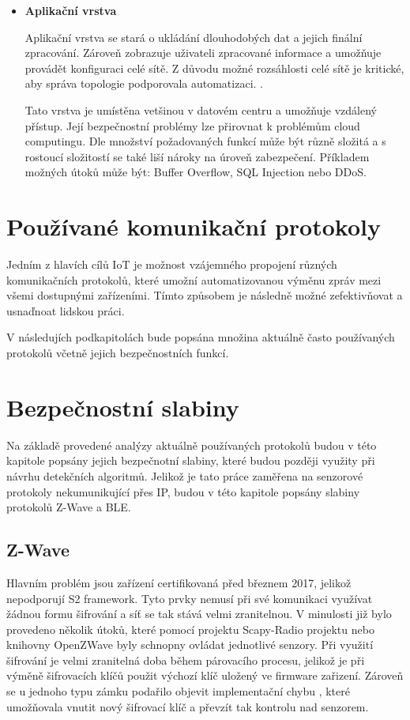 \begin{itemize}
 \item \textbf{Aplikační vrstva}
 
 Aplikační vrstva se stará o ukládání dlouhodobých dat a jejich finální zpracování. 
 Zároveň zobrazuje uživateli zpracované informace a umožňuje provádět konfiguraci
 celé sítě. Z důvodu možné rozsáhlosti celé sítě je kritické, aby správa
 topologie podporovala automatizaci. \cite{secFramework}.
 
 Tato vrstva je umístěna vetšinou v datovém centru a umožňuje vzdálený přístup. 
 Její bezpečnostní problémy lze přirovnat k problémům cloud computingu. Dle
 množství požadovaných funkcí může být různě složitá a s rostoucí složitostí
 se také liší nároky na úroveň zabezpečení. Příkladem možných útoků může být:
 Buffer Overflow, SQL Injection nebo DDoS.
 
\end{itemize}
 
 \newpage
 
 \section{Používané komunikační protokoly} \label{protokoly}
 Jedním z hlavích cílů IoT je možnost vzájemného propojení různých komunikačních protokolů, 
 které umožní automatizovanou výměnu zpráv mezi všemi dostupnými zařízeními. Tímto způsobem
 je následně možné zefektivňovat a usnaďnoat lidskou práci.
 
 V následujích podkapitolách bude popsána množina aktuálně často používaných protokolů
 včetně jejich bezpečnostních funkcí.
 
  
   
   \newpage
  \section{Bezpečnostní slabiny}
  Na základě provedené analýzy aktuálně používaných protokolů budou v této kapitole 
  popsány jejich bezpečnotní slabiny, které budou později využity při návrhu 
  detekčních algoritmů. Jelikož je tato práce zaměřena na senzorové protokoly 
  nekumunikující přes IP, budou v této kapitole popsány slabiny protokolů 
  Z-Wave a BLE.
  
 \subsection{Z-Wave}
 Hlavním problém jsou zařízení certifikovaná před březnem 2017, jelikož nepodporují S2 framework.
 Tyto prvky nemusí při své komunikaci využívat žádnou formu šifrování a síť se tak stává 
 velmi zranitelnou. V minulosti již bylo provedeno několik útoků, které pomocí projektu
 Scapy-Radio projektu \cite{ezwave} nebo knihovny OpenZWave  byly schnopny ovládat jednotlivé senzory. 
 Při využití šifrování je velmi zranitelná doba během párovacího procesu, jelikož je při výměně
 šifrovacích klíčů použit výchozí klíč uložený ve firmware zařizení. Zároveň se 
 u jednoho typu zámku podařilo objevit implementační chybu \cite{zwave-S0-attack}, které umožňovala vnutit 
 nový šifrovací klíč a převzít tak kontrolu nad senzorem. 
 
